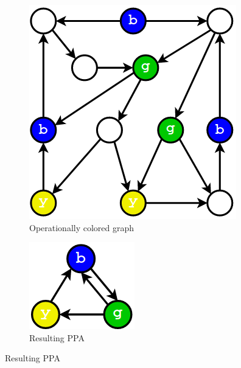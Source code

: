\begin{figure}[hbt]
\label{fig:ppa}
 \centering
 \begin{subfigure}[b]{0.4\linewidth}
 \includegraphics[width=\linewidth]{figs/opcoloring.png}
 \caption{Operationally colored graph}
 \end{subfigure}
 \begin{subfigure}[b]{0.3\linewidth}
 \includegraphics[width=\linewidth]{figs/ppa.png}
 \caption{Resulting PPA}
 \end{subfigure}
\end{figure}

